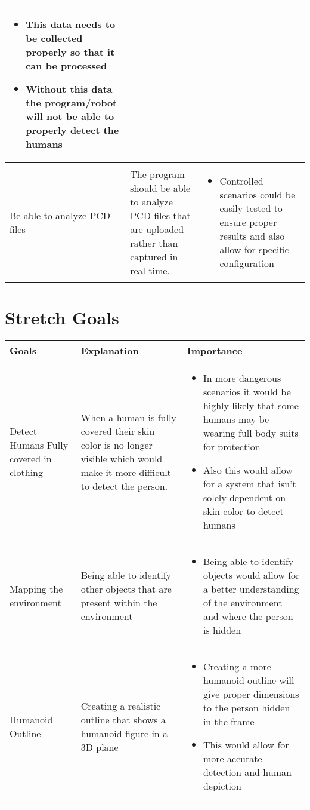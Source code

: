 \documentclass{article}
\begin{document}
\begin{tabular}{ |p{3cm}|p{3cm}|p{6cm}|  }
        \begin{itemize}
        \item This data needs to be collected properly so that it can be processed
        \item Without this data the program/robot will not be able to properly detect the humans
        \end{itemize}\\
        \hline
        Be able to analyze PCD files & The program should be able to analyze PCD files that are uploaded rather than captured in real time. & 
        \begin{itemize}
        \item Controlled scenarios could be easily tested to ensure proper results and also allow for specific configuration
        \end{itemize}\\
        \hline
        \end{tabular}
        

\section{Stretch Goals}
    \begin{tabular}{ |p{3cm}|p{3cm}|p{6cm}|  }
    \hline
    Goals & Explanation & Importance \\
    \hline
    Detect Humans Fully covered in clothing  & When a human is fully covered their skin color is no longer visible which would make it more difficult to detect the person.     & 
    \begin{itemize}
      \item In more dangerous scenarios it would be highly likely that some humans may be wearing full body suits for protection
      \item Also this would allow for a system that isn’t solely dependent on skin color to detect humans 
    \end{itemize}\\
    \hline
    Mapping the environment & Being able to identify other objects that are present within the environment    & 
    \begin{itemize}
      \item Being able to identify objects would allow for a better understanding of the environment and where the person is hidden 
    \end{itemize}\\
    \hline
    Humanoid Outline & Creating a realistic outline that shows a humanoid figure in a 3D plane    & 
    \begin{itemize}
      \item Creating a more humanoid outline will give proper dimensions to the person hidden in the frame
      \item This would allow for more accurate detection and human depiction 
    \end{itemize}\\
    \hline
    \end{tabular}
\end{document}
